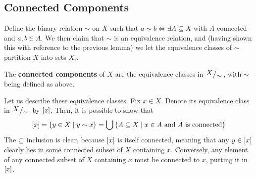  \subsection{Connected Components}

 Define the binary relation $\sim$ on $X$ such that $a \sim b\iff \exists A\subseteq X$ with $A$ connected and $a,b \in A$. We then claim that $\sim$ is an equivalence relation, and (having shown this with reference to the previous lemma) we let the equivalence classes of $\sim$ partition $X$ into sets $X_i$.
 \begin{boxdefinition}
     The \textbf{connected components} of $X$ are the equivalence classes in $\quotient{X}{\sim}$, with $\sim$ being defined as above.
 \end{boxdefinition}

Let us describe these equivalence classes. Fix $x \in X$. Denote its equivalence class in $\quotient{X}{\sim}$ by $\left[ x \right]$. Then, it is possible to show that
\begin{align*}
    \left[ x \right] = \left\{ y \in X \; \middle\vert \; y \sim x \right\} = \bigcup\left\{ A \subseteq X \; \middle\vert \; x \in A \text{ and } A \text{ is connected} \right\}
\end{align*}
The $\subseteq$ inclusion is clear, because $\left[ x \right]$ is itself connected, meaning that any $y \in \left[ x \right]$ clearly lies in some connected subset of $X$ containing $x$. Conversely, any element of any connected subset of $X$ containing $x$ must be connected to $x$, putting it in $\left[ x \right]$.

